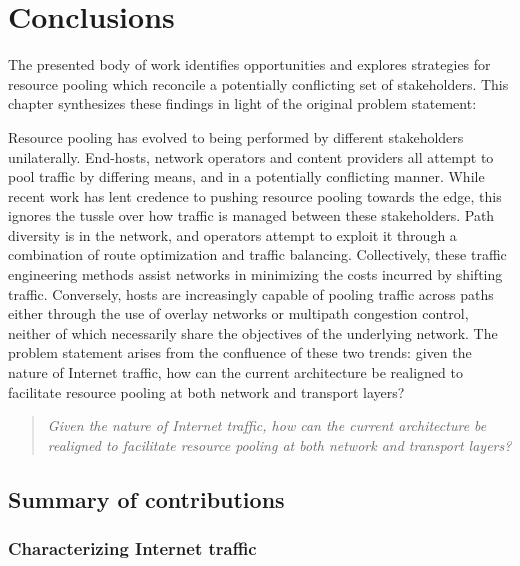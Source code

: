\chapter{Conclusions}
\label{sec:conclusions}

The presented body of work identifies opportunities and explores strategies for resource pooling which reconcile a potentially conflicting set of stakeholders.
\LOREM
This chapter synthesizes these findings in light of the original problem statement:

Resource pooling has evolved to being performed by different stakeholders unilaterally.
End-hosts, network operators and content providers all attempt to pool traffic by differing means, and in a potentially conflicting manner.
While recent work has lent credence to pushing resource pooling towards the edge, this ignores the tussle over how traffic is managed between these stakeholders.
Path diversity is in the network, and operators attempt to exploit it through a combination of route optimization and traffic balancing.
Collectively, these traffic engineering methods assist networks in minimizing the costs incurred by shifting traffic.
Conversely, hosts are increasingly capable of pooling traffic across paths either through the use of overlay networks or multipath congestion control, neither of which necessarily share the objectives of the underlying network.
The problem statement arises from the confluence of these two trends: given the nature of Internet traffic, how can the current architecture be realigned to facilitate resource pooling at both network and transport layers?



\begin{quote}
\textit{
Given the nature of Internet traffic, how can the current architecture be realigned to facilitate resource pooling at both network and transport layers?
}
\end{quote}

\section{Summary of contributions}

\subsection{Characterizing Internet traffic}




